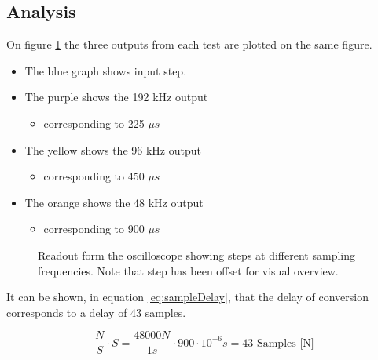 \subsection{Analysis}\label{sec:AnalysisFsDelay}

On figure \ref{fig:ScopeDelayExperiment} the three outputs from each test are plotted on the same figure.

\begin{itemize}
	\item The \textcolor{MATLABblue}{blue} graph shows input step.
	\item The \textcolor{MATLABpurple}{purple} shows the 192 kHz output
	\begin{itemize}
		\item corresponding to 225 $\mu s$
	\end{itemize}
	\item The \textcolor{MATLAByellow}{yellow} shows the 96 kHz output
	\begin{itemize}
		\item corresponding to 450 $\mu s$
	\end{itemize}
	\item The \textcolor{MATLABorange}{orange} shows the 48 kHz output
	\begin{itemize}
		\item corresponding to 900 $\mu s$
	\end{itemize}
\end{itemize}
 

\begin{figure}[H]
	\centering
	
	\caption{Readout form the oscilloscope showing steps at different sampling frequencies. Note that step has been offset for visual overview.}
	\label{fig:ScopeDelayExperiment}
\end{figure}

It can be shown, in equation \ref{eq:sampleDelay}, that the delay of conversion corresponds to a delay of 43 samples.

\begin{equation}\label{eq:sampleDelay}
	\frac{N}{S} \cdot S = \frac{48000N}{1s} \cdot 900\cdot 10^{-6}s = 43 \text{ Samples [N]} 
\end{equation}





